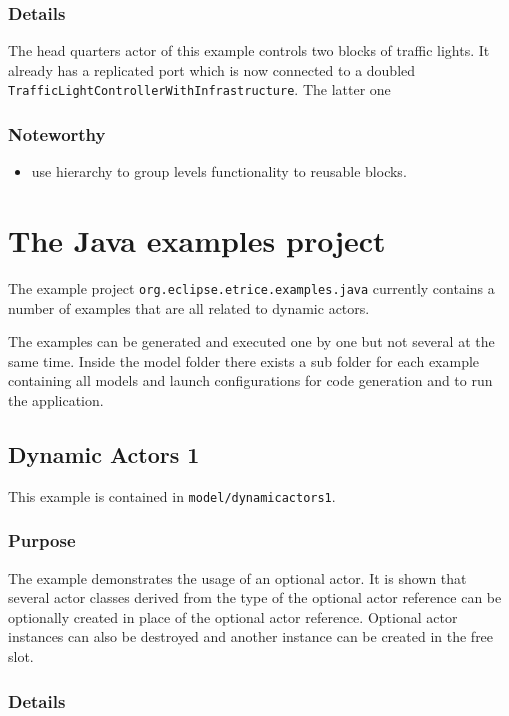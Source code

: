 \subsubsection{Details}

The head quarters actor of this example controls two blocks of traffic
lights. It already has a replicated port which is now connected
to a doubled \texttt{TrafficLightControllerWithInfrastructure}.
The latter one 

\subsubsection{Noteworthy}

\begin{itemize}
\item use hierarchy to group levels functionality to reusable blocks.
\end{itemize}

\section{The Java examples project}

The example project \texttt{org.eclipse.etrice.examples.java} currently contains
a number of examples that are all related to dynamic actors.

The examples can be generated and executed one by one but not several at the same
time. Inside the model folder there exists a sub folder for each example
containing all models and launch configurations for code generation and to
run the application.

\subsection{Dynamic Actors 1}

This example is contained in \texttt{model/dynamicactors1}.

\subsubsection{Purpose}

The example demonstrates the usage of an optional actor. It is shown that several actor classes
derived from the type of the optional actor reference can be optionally created in place
of the optional actor reference. Optional actor instances can also be destroyed
and another instance can be created in the free slot.

\subsubsection{Details}

